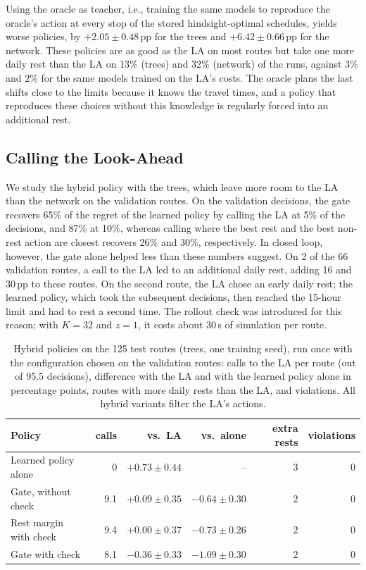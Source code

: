 \documentclass[runningheads]{llncs}
\begin{document}
Using the oracle as teacher, i.e., training the same models to reproduce the
oracle's action at every stop of the stored hindsight-optimal schedules,
yields worse policies, by $+2.05\pm0.48$\,pp for the trees and
$+6.42\pm0.66$\,pp for the network. These policies are as good as the LA on
most routes but take one more daily rest than the LA on 13\% (trees) and 32\%
(network) of the runs, against 3\% and 2\% for the same models trained on the
LA's costs. The oracle plans the last shifts close to the limits
because it knows the travel times, and a policy that reproduces these choices
without this knowledge is regularly forced into an additional rest.

\subsection{Calling the Look-Ahead}
\label{sec:hybrid}

We study the hybrid policy with the trees, which leave more room to the LA than
the network on the validation routes. On the validation decisions, the gate
recovers 65\% of the regret of the learned policy by calling the LA at 5\% of
the decisions, and 87\% at 10\%, whereas calling where the best rest and the
best non-rest action are closest recovers 26\% and 30\%, respectively. In
closed loop, however, the gate alone helped less than these numbers suggest.
On 2 of the 66 validation routes, a call to the LA led to an additional daily
rest, adding 16 and 30\,pp to these routes. On the second route, the LA chose
an early daily rest; the learned policy, which took the subsequent decisions,
then reached the 15-hour limit and had to rest a second time. The rollout check
was introduced for this reason; with $K=32$ and $z=1$, it costs about 30\,s of
simulation per route.

\begin{table}[t]
\caption{Hybrid policies on the 125 test routes (trees, one training seed), run
once with the configuration chosen on the validation routes: calls to the LA
per route (out of 95.5 decisions), difference with the LA and with the learned
policy alone in percentage points, routes with more daily rests than the LA,
and violations. All hybrid variants filter the LA's actions.}
\label{tab:hybrid}
\centering
\begin{tabular}{lrrrrr}
\toprule
Policy & calls & vs.\ LA & vs.\ alone & extra rests & violations\\
\midrule
Learned policy alone & 0 & $+0.73\pm0.44$ & -- & 3 & 0\\
Gate, without check & 9.1 & $+0.09\pm0.35$ & $-0.64\pm0.30$ & 2 & 0\\
Rest margin with check & 9.4 & $+0.00\pm0.37$ & $-0.73\pm0.26$ & 2 & 0\\
Gate with check & 8.1 & $-0.36\pm0.33$ & $-1.09\pm0.30$ & 2 & 0\\
\bottomrule
\end{tabular}
\end{table}
\end{document}
